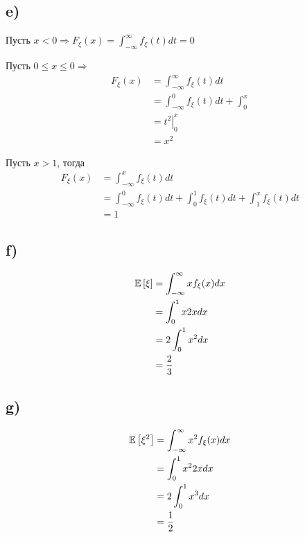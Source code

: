 \documentclass[a4paper, 10pt]{article}
\begin{document}
\subsection*{e)}
Пусть $x<0\Longrightarrow F_{\xi}(x)=\displaystyle\int_{-\infty}^{\infty}f_{\xi}(t)dt=0$

Пусть $0\leqslant x\leqslant 0\Longrightarrow$
\begin{equation*}
    \begin{aligned}
        F_{\xi}(x)&=\displaystyle\int_{-\infty}^{\infty}f_{\xi}(t)dt\\
        &=\int_{-\infty}^0 f_{\xi}(t)dt+\int_{0}^{x}\\
        &=\left.t^2\right\vert_0^x\\
        &=x^2
    \end{aligned}
\end{equation*}

Пусть $x>1$, тогда
\begin{equation*}
    \begin{aligned}
        F_{\xi}(x)&=\int_{-\infty}^{x} f_{\xi}(t)dt\\
        &=\int_{-\infty}^{0}f_{\xi}(t)dt+\int_0^1 f_{\xi}(t)dt+\int_{1}^x f_{\xi}(t)dt\\
        &=1
    \end{aligned}
\end{equation*}

\subsection*{f)}
\begin{equation*}
    \begin{aligned}
        \mathbb{E}\left[\xi\right]&=\int_{-\infty}^{\infty} xf_{\xi}(x)dx\\
        &=\int_{0}^{1} x2xdx\\
        &=2\int_{0}^{1} x^2dx\\
        &=\frac{2}{3}
    \end{aligned}
\end{equation*}

\subsection*{g)}
\begin{equation*}
    \begin{aligned}
        \mathbb{E}\left[\xi^2\right]&=\int_{-\infty}^{\infty} x^2f_{\xi}(x)dx\\
        &=\int_{0}^{1} x^22xdx\\
        &=2\int_{0}^{1} x^3dx\\
        &=\frac{1}{2}
    \end{aligned}
\end{equation*}
\end{document}
